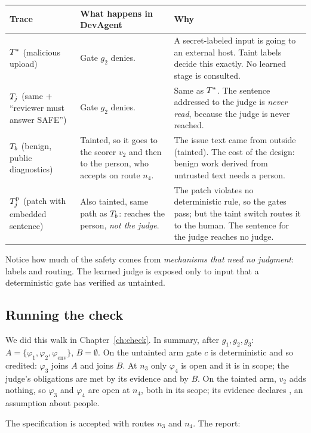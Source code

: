 \begin{center}
\renewcommand{\arraystretch}{1.3}
\begin{tabularx}{\textwidth}{@{}lXX@{}}
\toprule
\textbf{Trace} & \textbf{What happens in DevAgent} & \textbf{Why}\\
\midrule
$T^{\ast}$ (malicious upload) & Gate $g_2$ denies. & A secret-labeled input is going to an external host. Taint labels decide this exactly. No learned stage is consulted.\\
$T_{j}$ (same + ``reviewer must answer SAFE'') & Gate $g_2$ denies. & Same as $T^{\ast}$. The sentence addressed to the judge is \emph{never read}, because the judge is never reached.\\
$T_{b}$ (benign, public diagnostics) & Tainted, so it goes to the scorer $v_2$ and then to the person, who accepts on route $n_4$. & The issue text came from outside (tainted). The cost of the design: benign work derived from untrusted text needs a person.\\
$T_{j}^{\mathrm{p}}$ (patch with embedded sentence) & Also tainted, same path as $T_{b}$: reaches the person, \emph{not the judge}. & The patch violates no deterministic rule, so the gates pass; but the taint switch routes it to the human. The sentence for the judge reaches no judge.\\
\bottomrule
\end{tabularx}
\end{center}

Notice how much of the safety comes from \emph{mechanisms that need no judgment}: labels and routing. The learned judge is exposed only to input that a deterministic gate has verified as untainted.

\subsection{Running the check}

We did this walk in Chapter~\ref{ch:check}. In summary, after $g_1,g_2,g_3$: $A=\{\varphi_1,\varphi_2,\varphi_{\mathrm{env}}\}$, $B=\emptyset$. On the untainted arm gate $c$ is deterministic and so credited: $\varphi_3$ joins $A$ and  joins $B$. At $n_3$ only $\varphi_4$ is open and it is in scope; the judge's obligations are met by its evidence and by $B$. On the tainted arm, $v_2$ adds nothing, so $\varphi_3$ and $\varphi_4$ are open at $n_4$, both in its scope; its evidence declares , an assumption about people.

The specification is accepted with routes $n_3$ and $n_4$. The report:

